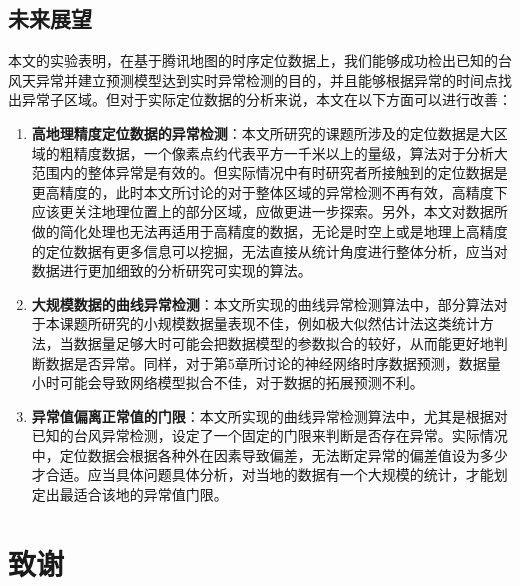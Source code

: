 \documentclass[a4paper,AutoFakeBold,oneside,12pt]{book}
\begin{document}
\section{未来展望}
本文的实验表明，在基于腾讯地图的时序定位数据上，我们能够成功检出已知的台风天异常并建立预测模型达到实时异常检测的目的，并且能够根据异常的时间点找出异常子区域。但对于实际定位数据的分析来说，本文在以下方面可以进行改善：
\begin{enumerate}
\item \textbf{高地理精度定位数据的异常检测}：本文所研究的课题所涉及的定位数据是大区域的粗精度数据，一个像素点约代表平方一千米以上的量级，算法对于分析大范围内的整体异常是有效的。但实际情况中有时研究者所接触到的定位数据是更高精度的，此时本文所讨论的对于整体区域的异常检测不再有效，高精度下应该更关注地理位置上的部分区域，应做更进一步探索。另外，本文对数据所做的简化处理也无法再适用于高精度的数据，无论是时空上或是地理上高精度的定位数据有更多信息可以挖掘，无法直接从统计角度进行整体分析，应当对数据进行更加细致的分析研究可实现的算法。
\item \textbf{大规模数据的曲线异常检测}：本文所实现的曲线异常检测算法中，部分算法对于本课题所研究的小规模数据量表现不佳，例如极大似然估计法这类统计方法，当数据量足够大时可能会把数据模型的参数拟合的较好，从而能更好地判断数据是否异常。同样，对于第5章所讨论的神经网络时序数据预测，数据量小时可能会导致网络模型拟合不佳，对于数据的拓展预测不利。
\item \textbf{异常值偏离正常值的门限}：本文所实现的曲线异常检测算法中，尤其是根据对已知的台风异常检测，设定了一个固定的门限来判断是否存在异常。实际情况中，定位数据会根据各种外在因素导致偏差，无法断定异常的偏差值设为多少才合适。应当具体问题具体分析，对当地的数据有一个大规模的统计，才能划定出最适合该地的异常值门限。
\end{enumerate}



\clearpage{}


\clearpage{}
\chapter*{致\qquad{}谢}
\normalsize\thankwords

\setcounter{figure}{0} 
\renewcommand{\thefigure}{~附-\arabic{figure}~}
\setcounter{equation}{0} 
\renewcommand{\theequation}{~附-\arabic{equation}~}
\setcounter{table}{0} 
\renewcommand{\thetable}{~附-\arabic{table}~}
\end{document}
